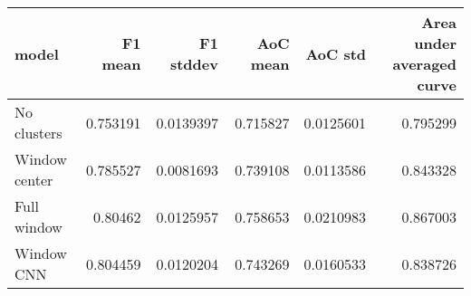 \begin{tabular}{lrrrrr}
\toprule
 model         &   F1 mean &   F1 stddev &   AoC mean &   AoC std &   Area under averaged curve \\
\midrule
 No clusters   &  0.753191 &   0.0139397 &   0.715827 & 0.0125601 &                    0.795299 \\
 Window center &  0.785527 &   0.0081693 &   0.739108 & 0.0113586 &                    0.843328 \\
 Full window   &  0.80462  &   0.0125957 &   0.758653 & 0.0210983 &                    0.867003 \\
 Window CNN    &  0.804459 &   0.0120204 &   0.743269 & 0.0160533 &                    0.838726 \\
\bottomrule
\end{tabular}